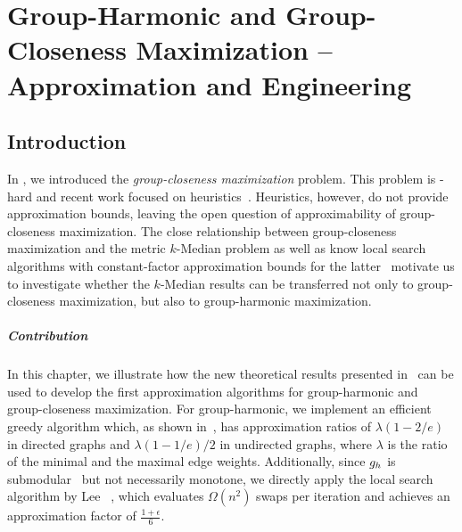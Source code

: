 \chapter{Group-Harmonic and Group-Closeness Maximization -- Approximation and Engineering}
\label{ch:group-harm-clos-max}

\section{Introduction}
In , we introduced the \emph{group-closeness
maximization} problem. This problem is \np-hard and recent work focused on
heuristics~\cite{DBLP:conf/bigdataconf/AngrimanGM19,DBLP:conf/alenex/BergaminiGM18,
DBLP:conf/adc/ChenWW16}.
Heuristics, however, do not provide approximation bounds, leaving the open
question of approximability of group-closeness maximization.
The close relationship between group-closeness maximization and the metric
$k$-Median problem as well as know local search algorithms with constant-factor
approximation bounds for the latter~\cite{DBLP:journals/siamcomp/AryaGKMMP04}
motivate us to investigate whether the $k$-Median results can be transferred
not only to group-closeness maximization, but also to group-harmonic
maximization.

\paragraph{Contribution}
%
In this chapter, we illustrate how the new theoretical results presented
in~\cite{DBLP:conf/alenex/AngrimanBDGGM21} can be used to develop the first
approximation algorithms for group-harmonic and group-closeness maximization.
For group-harmonic, we implement an efficient greedy algorithm which,
as shown in~\cite{DBLP:conf/alenex/AngrimanBDGGM21}, has
approximation ratios of $\lambda(1 - 2/e)$ in directed graphs and $\lambda(1 -
1/e)/2$ in undirected graphs, where $\lambda$ is the ratio of the minimal and
the maximal edge weights.
%
Additionally, since $g_h$ is
submodular~\cite{DBLP:conf/alenex/AngrimanBDGGM21} but not necessarily
monotone, we directly apply the local search algorithm by Lee
\etal~\cite{DBLP:journals/siamdm/LeeMNS10}, which evaluates $\Omega(n^2)$ swaps
per iteration and achieves an approximation factor of
$\frac{1 + \epsilon}{6}$.
%

